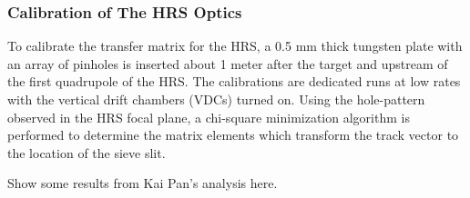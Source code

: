 
\subsubsection{Calibration of The HRS Optics}\label{sec:ana_optics}

To calibrate the transfer matrix for the HRS, a 0.5 mm thick 
tungsten plate with an array of pinholes
is inserted about 1 meter after the target and upstream
of the first quadrupole of the HRS.
The calibrations are dedicated runs at low rates with the
vertical drift chambers (VDCs) turned on.
Using the hole-pattern observed in the HRS focal plane,
a chi-square minimization algorithm is performed to 
determine the matrix elements which transform the
track vector to the location of the sieve slit.

Show some results from Kai Pan's analysis here.
